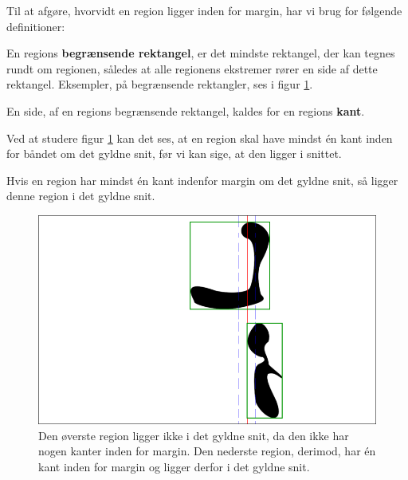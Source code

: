 {Til at afgøre, hvorvidt en region ligger inden for margin, har vi brug
for følgende definitioner:
\begin{definition}
    En regions \textbf{begrænsende rektangel}, er det mindste rektangel,
    der kan tegnes rundt om regionen, således at alle regionens
    ekstremer rører en side af dette rektangel. Eksempler, på
    begrænsende rektangler, ses i figur \ref{bbox_section}.
    \label{def_begraensende}
\end{definition}
\begin{definition}
    En side, af en regions begrænsende rektangel, kaldes for en regions
    \textbf{kant}.
    \label{def_region_kant}
\end{definition}
Ved at studere figur \ref{bbox_section} kan det ses, at en region skal
have mindst én kant inden for båndet om det gyldne snit, før vi kan
sige, at den ligger i snittet.
\begin{definition}
    Hvis en region har mindst én kant indenfor margin om det gyldne
    snit, så ligger denne region i det gyldne snit.
    \label{def_naiv}
\end{definition}

\begin{figure}[p]
    \begin{center}
        \includegraphics[scale=\imgscale,angle=0]{afsnit/vores_implementation/billeder/naiv_algoritme/bbox_section}
    \end{center}
    \caption[Begrænsende rektangler]{Den øverste region ligger ikke i
    det gyldne snit, da den ikke har nogen kanter inden for margin. Den
    nederste region, derimod, har én kant inden for margin og ligger
    derfor i det gyldne snit.} \label{bbox_section}
\end{figure}

}
